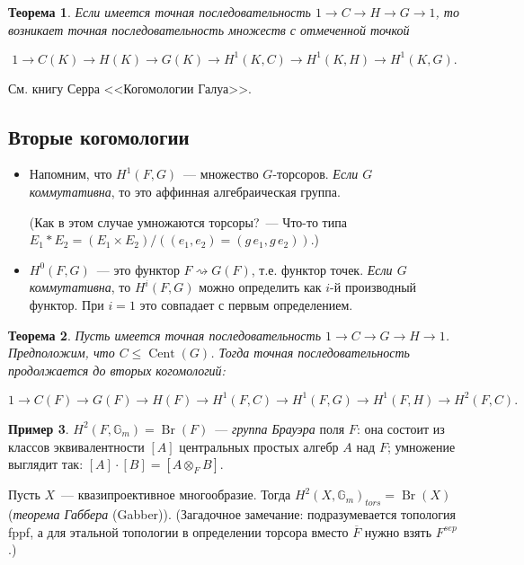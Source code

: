 \documentclass[a4paper]{article}
\DeclareMathOperator{\Cent}{Cent}
\DeclareMathOperator{\Br}{Br}
\newtheorem{theorem}{Теорема}[subsection]
\theoremstyle{definition}
\newtheorem{example}[theorem]{Пример}
\begin{document}
\begin{theorem}
Если имеется точная последовательность $1 \to C \to H \to G \to 1$, то
возникает точная последовательность множеств с отмеченной точкой

\[ 1 \to C(K) \to H(K) \to G(K) \to H^1 (K,C) \to H^1 (K,H) \to H^1 (K,G). \]
\end{theorem}

См. книгу Серра <<Когомологии Галуа>>.


\subsection{Вторые когомологии}

\begin{itemize}
\item Напомним, что $H^1 (F,G)$~--- множество $G$-торсоров. \emph{Если $G$
    коммутативна}, то это аффинная алгебраическая группа.

(Как в этом случае умножаются торсоры?~--- Что-то типа $E_1 \mathop{*}
E_2 = (E_1 \times E_2) / ((e_1,e_2) = (g\,e_1,g\,e_2))$.)

\item $H^0 (F,G)$~--- это функтор $F \rightsquigarrow G(F)$,
  т.е. функтор точек. \emph{Если $G$ коммутативна}, то $H^i (F,G)$
  можно определить как $i$-й производный функтор. При $i = 1$ это
  совпадает с первым определением.
\end{itemize}

\begin{theorem}
Пусть имеется точная последовательность $1 \to C \to G \to H \to
1$. Предположим, что $C \le \Cent (G)$. Тогда точная
последовательность продолжается до вторых когомологий:

\[ 1 \to C(F) \to G(F) \to H(F) \to H^1 (F,C) \to H^1 (F,G) \to H^1 (F,H) \to H^2 (F,C). \]
\end{theorem}

\begin{example}
$H^2 (F, \mathbb{G}_m)=\Br (F)$~--- \emph{группа Брауэра} поля $F$:
она состоит из классов эквивалентности $[A]$ центральных простых
алгебр $A$ над $F$; умножение выглядит так: $[A]\cdot
[B]=[A\otimes_FB]$.

Пусть $X$~--- квазипроективное многообразие. Тогда $H^2
(X,\mathbb{G}_m)_{tors} = \Br (X)$ (\emph{теорема Габбера} (Gabber)).
(Загадочное замечание:
подразумевается топология fppf, а для этальной топологии в определении
торсора вместо $\overline{F}$ нужно взять $F^{sep}$.)
\end{example}
\end{document}
